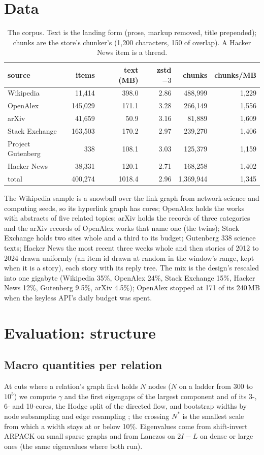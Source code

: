 \documentclass[11pt]{article}
\theoremstyle{plain}
\theoremstyle{definition}
\theoremstyle{remark}
\begin{document}
\section{Data}\label{sec:data}
\begin{table}[ht]
\centering\small
\begin{tabular}{lrrrrr}
\toprule
source & items & text (MB) & zstd $-3$ & chunks & chunks/MB\\
\midrule
Wikipedia & 11,414 & 398.0 & 2.86 & 488,999 & 1,229\\
OpenAlex & 145,029 & 171.1 & 3.28 & 266,149 & 1,556\\
arXiv & 41,659 & 50.9 & 3.16 & 81,889 & 1,609\\
Stack Exchange & 163,503 & 170.2 & 2.97 & 239,270 & 1,406\\
Project Gutenberg & 338 & 108.1 & 3.03 & 125,379 & 1,159\\
Hacker News & 38,331 & 120.1 & 2.71 & 168,258 & 1,402\\
\midrule
total & 400,274 & 1018.4 & 2.96 & 1,369,944 & 1,345\\
\bottomrule
\end{tabular}
\caption{The corpus. Text is the landing form (prose, markup removed, title prepended); chunks are the
store's chunker's (1,200 characters, 150 of overlap). A Hacker News item is a thread.}
\label{tab:data}
\end{table}
The Wikipedia sample is a snowball over the link graph from network-science and computing seeds, so
its hyperlink graph has cores; OpenAlex holds the works with abstracts of five related topics; arXiv
holds the records of three categories and the arXiv records of OpenAlex works that name one (the twins);
Stack Exchange holds two sites whole and a third to its budget; Gutenberg 338 science texts; Hacker
News the most recent three weeks whole and then stories of 2012 to 2024 drawn uniformly (an item id
drawn at random in the window's range, kept when it is a story), each story with its reply tree. The mix is the design's rescaled into
one gigabyte (Wikipedia 35\%, OpenAlex 24\%, Stack Exchange 15\%, Hacker News 12\%, Gutenberg 9.5\%,
arXiv 4.5\%); OpenAlex stopped at 171 of its 240\,MB when the keyless API's daily budget was spent.

\section{Evaluation: structure}\label{sec:eval}
\subsection{Macro quantities per relation}
At cuts where a relation's graph first holds $N$ nodes ($N$ on a ladder from 300 to $10^5$) we
compute $\gamma$ and the first eigengaps of the largest component and of its 3-, 6- and 10-cores, the
Hodge split of the directed flow, and bootstrap widths by node subsampling and edge resampling
\citep{efron1979}; the crossing $N^\ast$ is the smallest scale from which a width stays at or below
10\%. Eigenvalues come from shift-invert ARPACK \citep{lehoucq1998} on small sparse graphs and from
Lanczos on $2I-L$ on dense or large ones (the same eigenvalues where both run).
\end{document}
